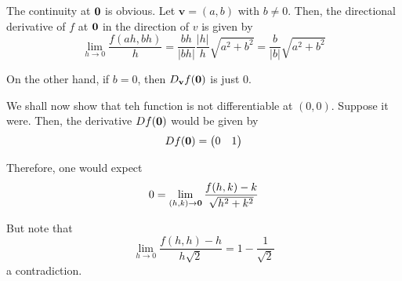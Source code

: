 The continuity at $\mathbf{0}$ is obvious. Let $\mathbf{v} = (a,b)$ with $b\ne 0$. Then, the directional derivative of $f$ at $\mathbf{0}$ in the direction of $v$ is given by 
\begin{equation*}
    \lim_{h\to0}\frac{f(ah, bh)}{h} = \frac{bh}{|bh|}\frac{|h|}{h}\sqrt{a^2 + b^2} = \frac{b}{|b|}\sqrt{a^2 + b^2}
\end{equation*}

On the other hand, if $b = 0$, then $D_{\mathbf{v}}f(\mathbf{0})$ is just $0$. 

We shall now show that teh function is not differentiable at $(0,0)$. Suppose it were. Then, the derivative $Df(\mathbf{0})$ would be given by 
\begin{equation*}
    Df(\mathbf{0}) = \begin{pmatrix}0 & 1\end{pmatrix}
\end{equation*}

Therefore, one would expect 
\begin{equation*}
    0 = \lim_{(h,k)\to\mathbf{0}}\frac{f(h,k) - k}{\sqrt{h^2 + k^2}}
\end{equation*}

But note that 
\begin{equation*}
    \lim_{h\to0}\frac{f(h,h) - h}{h\sqrt{2}} = 1 - \frac{1}{\sqrt{2}}
\end{equation*}
a contradiction.